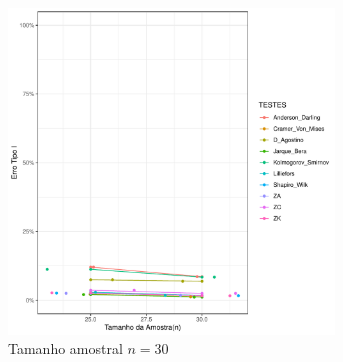 \documentclass[a4paper,11pt]{article} %
\begin{document}

\begin{figure}[H]
    \centering
    \caption{Comparação do Erro Tipo I dos testes AD, CM, DG, LL, JB, KS, LL, ZA, ZC e ZK em função do tamanho amostral para a \textbf{Distribuição} $\textbf{Cauchy}(0, 1)$.}
    \label{fig:erro_tipo_I_dist_cauchy}
    
    \begin{subfigure}[b]{0.45\textwidth}
        \centering
    \includegraphics[width=0.95\textwidth]{Distribuição Cauchy/Erro Tipo I/erro_tipo_I_cauchy_30.pdf}
        \caption{Tamanho amostral \(n = 30\)}
        \label{fig:cauchy_30}
    \end{subfigure}
    \hfill
    \begin{subfigure}[b]{0.45\textwidth}
        \centering

\end{subfigure}
\end{figure}
\end{document}
